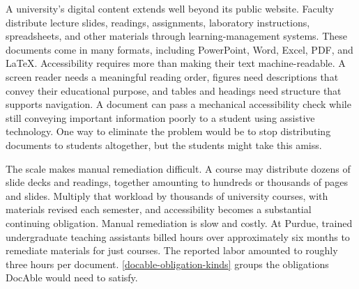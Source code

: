 A university's digital content extends well beyond its public website. Faculty distribute lecture slides, readings, assignments, laboratory instructions, spreadsheets, and other materials through learning-management systems. These documents come in many formats, including PowerPoint, Word, Excel, PDF, and LaTeX. Accessibility requires more than making their text machine-readable. A screen reader needs a meaningful reading order, figures need descriptions that convey their educational purpose, and tables and headings need structure that supports navigation\citep{w3c2018wcag21}. A document can pass a mechanical accessibility check while still conveying important information poorly to a student using assistive technology. One way to eliminate the problem would be to stop distributing documents to students altogether, but the students might take this amiss.

The scale makes manual remediation difficult. A course may distribute dozens of slide decks and readings, together amounting to hundreds or thousands of pages and slides. Multiply that workload by thousands of university courses, with materials revised each semester, and accessibility becomes a substantial continuing obligation. Manual remediation is slow and costly. At Purdue, trained undergraduate teaching assistants billed  hours over approximately six months to remediate materials for just  courses. The reported labor amounted to roughly three hours per document\citep{davis2026docable}. \autoref{docable-obligation-kinds} groups the obligations DocAble would need to satisfy.


